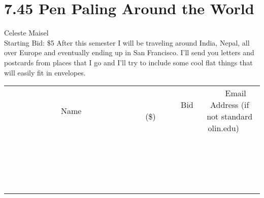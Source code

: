 \documentclass[11pt]{article}
\begin{document}
\section*{7.45 Pen Paling Around the World}
Celeste Maisel
\\
Starting Bid: \$5
\newline
After this semester I will be traveling around India, Nepal, all over Europe and eventually ending up in San Francisco.  I'll send you letters and postcards from places that I go and I'll try to include some cool flat things that will easily fit in envelopes.
\\[3ex]
\begin{tabular}{c c c}
~~~~~~~~~~~~~Name~~~~~~~~~~~~~ & ~~~~~~~~~Bid (\$)~~~~~~~~~  & ~~~Email Address (if not standard olin.edu)~~~\\
 & & \\
\hline
 & & \\
\hline
 & & \\
\hline
 & & \\
\hline
 & & \\
\hline
 & & \\
\hline
 & & \\
\hline
 & & \\
\hline
 & & \\
\hline
 & & \\
\hline
 & & \\
\hline
 & & \\
\hline
 & & \\
\hline
 & & \\
\hline
 & & \\
\hline
 & & \\
\hline
 & & \\
\hline
 & & \\
\hline
 & & \\
\hline
\end{tabular}
\newpage
\end{document}
